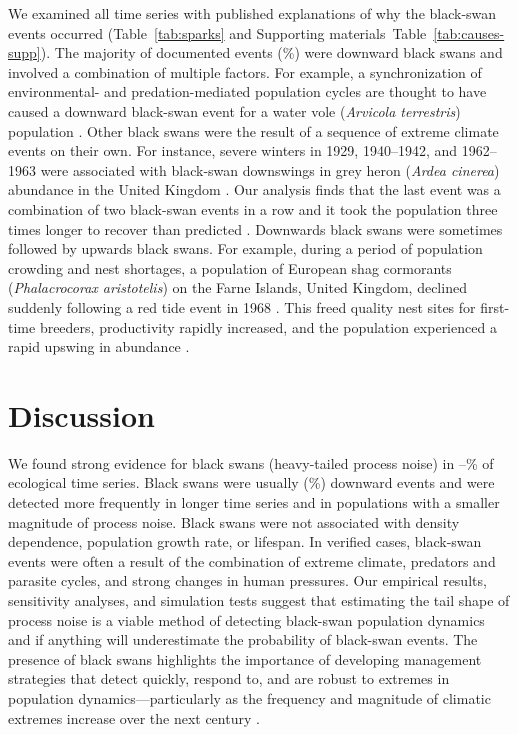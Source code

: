 We examined all time series with published explanations of why the black-swan
events occurred (Table~\ref{tab:sparks} and Supporting materials~Table~\ref{tab:causes-supp}). The
majority of documented events (\percBSDown \%) were downward black swans and
involved a combination of multiple factors. For example, a synchronization of
environmental- and predation-mediated population cycles are thought to have
caused a downward black-swan event for a water vole (\textit{Arvicola
  terrestris}) population \citep{saucy1994}. Other black swans were the result
of a sequence of extreme climate events on their own. For instance, severe
winters in 1929, 1940--1942, and 1962--1963 were associated with black-swan
downswings in grey heron (\textit{Ardea cinerea}) abundance in the United
Kingdom \citep{stafford1971}. Our analysis finds that the last event was a
combination of two black-swan events in a row and it took the population three
times longer to recover than predicted \citep{stafford1971}. Downwards black
swans were sometimes followed by upwards black swans. For example, during a
period of population crowding and nest shortages, a population of European
shag cormorants (\textit{Phalacrocorax aristotelis}) on the Farne Islands,
United Kingdom, declined suddenly following a red tide event in 1968
\citep{potts1980}. This freed quality nest sites for first-time breeders,
productivity rapidly increased, and the population experienced a rapid upswing
in abundance \citep{potts1980}.


\section{Discussion}

We found strong evidence for black swans (heavy-tailed process noise) in
\overallMinPerc--\overallMaxPerc\% of ecological time series. Black swans were
usually (\percBSDown \%) downward events and were detected more frequently in
longer time series and in populations with a smaller magnitude of process
noise. Black swans were not associated with density dependence, population
growth rate, or lifespan. In verified cases, black-swan events were often a
result of the combination of extreme climate, predators and parasite cycles,
and strong changes in human pressures. Our empirical results, sensitivity
analyses, and simulation tests suggest that estimating the tail shape of
process noise is a viable method of detecting black-swan population dynamics
and if anything will underestimate the probability of black-swan events. The
presence of black swans highlights the importance of developing management
strategies that detect quickly, respond to, and are robust to extremes in
population dynamics---particularly as the frequency and magnitude of climatic
extremes increase over the next century \citep{easterling2000,ipcc2012}.

